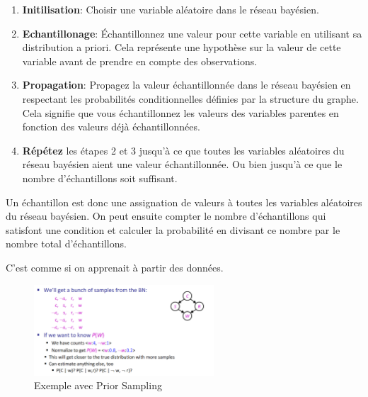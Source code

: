 \begin{enumerate}
    \item \textbf{Initilisation}: Choisir une variable aléatoire dans le réseau bayésien.
    \item \textbf{Echantillonage}: Échantillonnez une valeur pour cette variable en utilisant sa distribution a priori. 
        Cela représente une hypothèse sur la valeur de cette variable avant de prendre en compte des observations.
    \item \textbf{Propagation}: Propagez la valeur échantillonnée dans le réseau bayésien en 
        respectant les probabilités conditionnelles définies par la structure du graphe. 
        Cela signifie que vous échantillonnez les valeurs des variables parentes en fonction des valeurs déjà échantillonnées.
    \item \textbf{Répétez} les étapes 2 et 3 jusqu'à ce que toutes les variables aléatoires du réseau bayésien aient une valeur échantillonnée. Ou bien jusqu'à ce que le nombre d'échantillons soit suffisant.
\end{enumerate}

Un échantillon est donc une assignation de valeurs à toutes les variables aléatoires du réseau bayésien.
On peut ensuite compter le nombre d'échantillons qui satisfont une condition et calculer la probabilité en divisant ce nombre par le nombre total d'échantillons.


\begin{remark}\leavevmode
    C'est comme si on apprenait à partir des données.
\end{remark}

\begin{figure}[H]
    \begin{center}
        \includegraphics[width=0.6\textwidth]{../pictures/priors.png}
    \end{center}
    \caption{Exemple avec Prior Sampling}\label{fig:priors}
\end{figure}


